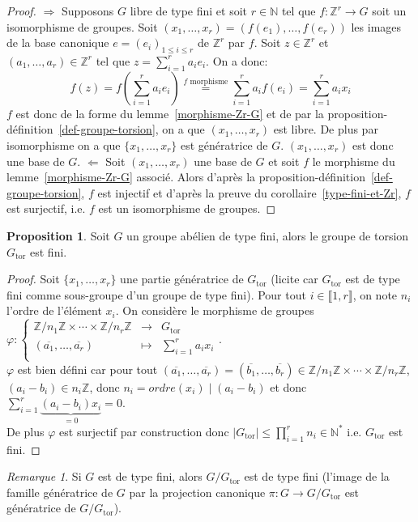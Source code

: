 \documentclass{report}
\newcommand{\Z}{\mathbb{Z}}
\newcommand{\N}{\mathbb{N}}
\newcommand{\Gt}{G_{\mathrm{tor}}}
\newcommand{\direct}{\textcircled{$\Rightarrow$} }
\newcommand{\reciproque}{\textcircled{$\Leftarrow$} }
\newcommand{\dis}{\displaystyle}
\newcommand{\nt}[1]{\llbracket  #1 \rrbracket }
\theoremstyle{definition}
\newtheorem{prop}[defi]{Proposition}
\theoremstyle{remark}
\newtheorem{rem}[defi]{Remarque}
\newcommand{\app}[5]{#1:\left\{\begin{array}{ccl}
#2 & \longrightarrow & #3 \\
#4 & \longmapsto & #5  \\
\end{array}\right.
}
\begin{document}
\begin{proof}
\direct Supposons $G$ libre de type fini et soit $r\in\N$ tel que $f:\Z^r\to G$ soit un isomorphisme de groupes. Soit $(x_1, \ldots ,x_r)=(f(e_1),\ldots, f(e_r))$ les images de la base canonique $e=(e_i)_{1\leqslant i\leqslant r}$ de $\Z^r$ par $f$. Soit $z\in\Z^r$ et $(a_1,\ldots,a_r)\in\Z^r$ tel que $z=\dis\sum_{i=1}^r a_ie_i$. On a donc:
$$f(z)=f(\dis\sum_{i=1}^r a_i e_i)\stackrel{\textrm{$f$ morphisme}}{=}\dis\sum_{i=  1}^r a_if(e_i)=\dis\sum_{i=  1}^r a_ix_i$$
$f$ est donc de la forme du lemme~\ref{morphisme-Zr-G} et de par la proposition-d\'efinition~\ref{def-groupe-torsion}, on a que $(x_1, \ldots ,x_r)$ est libre. De plus par isomorphisme on a que $\{x_1, \ldots ,x_r\}$ est génératrice de $G$. $(x_1, \ldots ,x_r)$ est donc une base de $G$.\bigbreak
\reciproque Soit $(x_1, \ldots ,x_r)$ une base de $G$ et soit $f$ le morphisme du lemme~\ref{morphisme-Zr-G} associ\'e. Alors d'apr\`es la proposition-d\'efinition~\ref{def-groupe-torsion}, $f$ est injectif et d'apr\`es la preuve du corollaire~\ref{type-fini-et-Zr}, $f$ est surjectif, i.e. $f$ est un isomorphisme de groupes.
\end{proof}

\begin{prop}
Soit $G$ un groupe abélien de type fini, alors le groupe de torsion $\Gt$ est fini.
\end{prop}

\begin{proof}
Soit $\{x_1, \ldots ,x_r\}$ une partie génératrice de $\Gt$ (licite car $\Gt$ est de type fini comme sous-groupe d'un groupe de type fini). Pour tout $i \in \nt{1,r}$, on note $n_i$ l'ordre de l'élément $x_i$. On considère le morphisme de groupes $\app{\varphi}{\Z/n_1\Z \times \cdots \times \Z/n_r\Z}{\Gt}{(\overline{a_1}, \ldots, \overline{a_r})}{\dis \sum_{i=1}^r a_ix_i}$.\\
$\varphi$ est bien défini car pour tout $(\overline{a_1}, \ldots, \overline{a_r})=(\overline{b_1}, \ldots, \overline{b_r}) \in \Z/n_1\Z \times \cdots \times \Z/n_r\Z$, $(a_i-b_i)\in n_i\Z$, donc $n_i=ordre(x_i)\mid (a_i-b_i)$ et donc $\dis \sum_{i=1}^r \underbrace{(a_i-b_i)x_i}_{=0}=0$.\\
De plus $\varphi$ est surjectif par construction  donc $\vert \Gt \vert \leqslant \dis \prod_{i=1}^r n_i \in \N^*$ i.e. $\Gt$ est fini.
\end{proof}

\begin{rem}
Si $G$ est de type fini, alors $G/\Gt$ est de type fini (l'image de la famille g\'en\'eratrice de $G$ par la projection canonique $\pi:G\to G/\Gt$ est g\'en\'eratrice de $G/\Gt$).
\end{rem}
\end{document}
